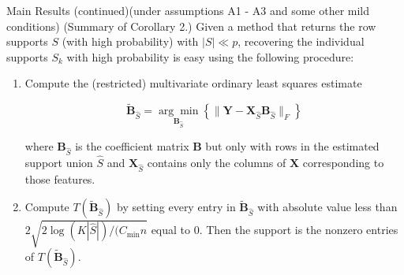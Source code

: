 \documentclass[notes]{beamer}       %
\begin{document}
\begin{frame}{Main Results (continued)}{(under assumptions A1 - A3 and some other mild conditions)}
    (Summary of Corollary 2.) Given a method that returns the row supports \(S\) (with high probability) with \(|S| \ll p\), recovering the individual supports \(S_k\) with high probability is easy using the following procedure:
    \begin{enumerate}[(1)]
    \item Compute the (restricted) multivariate ordinary least squares estimate
    
    \begin{equation}
    \tilde{\boldsymbol{B}}_{\hat{S}} = \underset{\boldsymbol{B}_{\hat{S}}}{ \arg \min} \left\{   \lVert \boldsymbol{Y} - \boldsymbol{X}_{\hat{S}} \boldsymbol{B}_{\hat{S}} \rVert_F \right\}
    \end{equation}
    
    where \( \boldsymbol{B}_{\hat{S}}\) is the coefficient matrix \(\boldsymbol{B}\) but only with rows in the estimated support union \(\hat{S}\) and  \( \boldsymbol{X}_{\hat{S}}\) contains only the columns of \(\boldsymbol{X}\) corresponding to those features.
    
    \item Compute \(T(\tilde{\boldsymbol{B}}_{\hat{S}})\) by setting every entry in \( \tilde{\boldsymbol{B}}_{\hat{S}} \) with absolute value less than \(2 \sqrt{ 2 \log(K |\hat{S}|)/(C_{\text{min}} n}\) equal to 0. Then the support is the nonzero entries of \(T(\tilde{\boldsymbol{B}}_{\hat{S}})\).
    
    \end{enumerate}
   
\end{frame}

\end{document}
